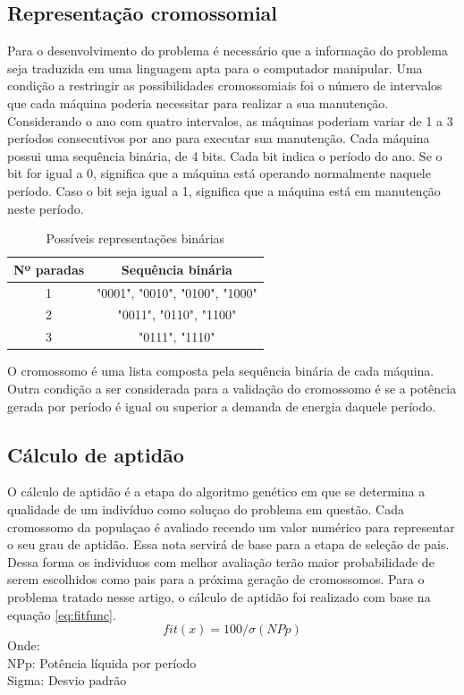 \documentclass[twoside]{article}
\begin{document}
\begin{multicols}{2}
\subsection{Representação cromossomial}
Para o desenvolvimento do problema é necessário que a informação do problema seja traduzida em uma linguagem apta para o computador manipular. Uma condição a restringir as possibilidades cromossomiais foi o número de intervalos que cada máquina poderia necessitar para realizar a sua manutenção. Considerando o ano com quatro intervalos, as máquinas poderiam variar de 1 a 3 períodos consecutivos por ano para executar sua manutenção. 
Cada máquina possui uma sequência binária, de 4 bits. Cada bit indica o período do ano. Se o bit for igual a 0, significa que a máquina está operando normalmente naquele período. Caso o bit seja igual a 1, significa que a máquina está em manutenção neste período.

\begin{table}[H]
\caption{Possíveis representações binárias}
\centering
\begin{tabular}{cc}
\toprule
Nº paradas & Sequência binária\\
\midrule
1 & "0001", "0010", "0100", "1000"\\
2 & "0011", "0110", "1100"\\
3 & "0111", "1110"\\
\bottomrule
\end{tabular}
\end{table}

O cromossomo é uma lista composta pela sequência binária de cada máquina. Outra condição a ser considerada para a validação do cromossomo é se a potência gerada por período é igual ou superior a demanda de energia daquele período.

\subsection{Cálculo de aptidão}
O cálculo de aptidão é a etapa do algoritmo genético em que se determina a qualidade de um indivíduo como soluçao do problema em questão. Cada cromossomo da populaçao é avaliado recendo um valor numérico para representar o seu grau de aptidão. Essa nota servirá de base para a etapa de seleção de pais. Dessa forma os individuos com melhor avaliação terão maior probabilidade de serem escolhidos como pais para a próxima geração de cromossomos. Para o problema tratado nesse artigo, o cálculo de aptidão foi realizado com base na equação \ref{eq:fitfunc}.
\begin{equation}
\label{eq:fitfunc}
fit(x) = 100 / \sigma (NPp) 
\end{equation}
Onde:
\\NPp: Potência líquida por período
\\Sigma: Desvio padrão



\end{multicols}
\end{document}
